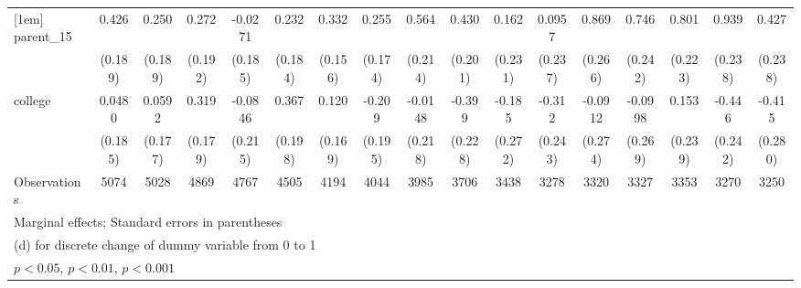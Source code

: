 {\begin{tabular}{l*{16}{c}}
[1em]
parent\_15           &       0.426\sym{*}  &       0.250         &       0.272         &     -0.0271         &       0.232         &       0.332\sym{*}  &       0.255         &       0.564\sym{**} &       0.430\sym{*}  &       0.162         &      0.0957         &       0.869\sym{**} &       0.746\sym{**} &       0.801\sym{***}&       0.939\sym{***}&       0.427         \\
                    &     (0.189)         &     (0.189)         &     (0.192)         &     (0.185)         &     (0.184)         &     (0.156)         &     (0.174)         &     (0.214)         &     (0.201)         &     (0.231)         &     (0.237)         &     (0.266)         &     (0.242)         &     (0.223)         &     (0.238)         &     (0.238)         \\
[1em]
college             &      0.0480         &      0.0592         &       0.319         &     -0.0846         &       0.367         &       0.120         &      -0.209         &     -0.0148         &      -0.399         &      -0.185         &      -0.312         &     -0.0912         &     -0.0998         &       0.153         &      -0.446         &      -0.415         \\
                    &     (0.185)         &     (0.177)         &     (0.179)         &     (0.215)         &     (0.198)         &     (0.169)         &     (0.195)         &     (0.218)         &     (0.228)         &     (0.272)         &     (0.243)         &     (0.274)         &     (0.269)         &     (0.239)         &     (0.242)         &     (0.280)         \\
\hline
Observations        &        5074         &        5028         &        4869         &        4767         &        4505         &        4194         &        4044         &        3985         &        3706         &        3438         &        3278         &        3320         &        3327         &        3353         &        3270         &        3250         \\
\hline\hline
\multicolumn{17}{l}{\footnotesize Marginal effects; Standard errors in parentheses}\\
\multicolumn{17}{l}{\footnotesize  (d) for discrete change of dummy variable from 0 to 1}\\
\multicolumn{17}{l}{\footnotesize \sym{*} \(p<0.05\), \sym{**} \(p<0.01\), \sym{***} \(p<0.001\)}\\
\end{tabular}
}
